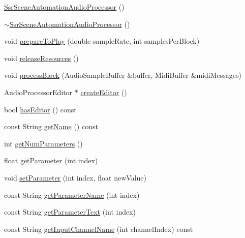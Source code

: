 \begin{DoxyCompactItemize}
\item 
\hyperlink{classSsrSceneAutomationAudioProcessor_a31b57d7c7f5c2acf0ff1f3967d3a9f5e}{Ssr\-Scene\-Automation\-Audio\-Processor} ()
\item 
\hyperlink{classSsrSceneAutomationAudioProcessor_a1be67dcc7f2eb2a560f7195b3a08d722}{$\sim$\-Ssr\-Scene\-Automation\-Audio\-Processor} ()
\item 
void \hyperlink{classSsrSceneAutomationAudioProcessor_a5e2395f7b4071ae1e32fbc27bd55e723}{prepare\-To\-Play} (double sample\-Rate, int samples\-Per\-Block)
\item 
void \hyperlink{classSsrSceneAutomationAudioProcessor_aa785afcd23ef7d76706c6a77cc580ba9}{release\-Resources} ()
\item 
void \hyperlink{classSsrSceneAutomationAudioProcessor_acc16cd381aa1d34399a0269fdc366b6f}{process\-Block} (Audio\-Sample\-Buffer \&buffer, Midi\-Buffer \&midi\-Messages)
\item 
Audio\-Processor\-Editor $\ast$ \hyperlink{classSsrSceneAutomationAudioProcessor_aba22d3fa2b9544fbe16ec2f14371b891}{create\-Editor} ()
\item 
bool \hyperlink{classSsrSceneAutomationAudioProcessor_a4eb39183e8c9c9ef3a85c07d08694cf0}{has\-Editor} () const 
\item 
const String \hyperlink{classSsrSceneAutomationAudioProcessor_ac6b3faf16b722aa1751e9a304ddf3e3e}{get\-Name} () const 
\item 
int \hyperlink{classSsrSceneAutomationAudioProcessor_a6313fc89ab2b2d05dba38af3306b53bf}{get\-Num\-Parameters} ()
\item 
float \hyperlink{classSsrSceneAutomationAudioProcessor_ac352fd36aa2a65b61be25586798e40ee}{get\-Parameter} (int index)
\item 
void \hyperlink{classSsrSceneAutomationAudioProcessor_a773e1a285faf01349aa3e40326b150b2}{set\-Parameter} (int index, float new\-Value)
\item 
const String \hyperlink{classSsrSceneAutomationAudioProcessor_a1c06b922487949f19b6bd6e332d4d961}{get\-Parameter\-Name} (int index)
\item 
const String \hyperlink{classSsrSceneAutomationAudioProcessor_a618f8dd5bfcf2d1fe0ffadf99eaa6cb2}{get\-Parameter\-Text} (int index)
\item 
const String \hyperlink{classSsrSceneAutomationAudioProcessor_afb7c6d06cfcc363d08a0778a028d00d8}{get\-Input\-Channel\-Name} (int channel\-Index) const 
\item 

\end{DoxyCompactItemize}
